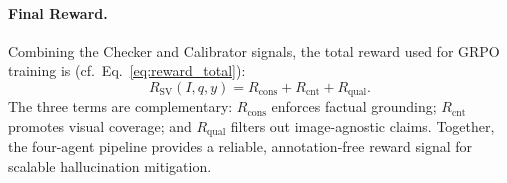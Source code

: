 \paragraph{Final Reward.}
Combining the Checker and Calibrator signals, the total reward
used for GRPO training is (cf.\ Eq.~\eqref{eq:reward_total}):
\begin{equation}
    R_{\mathrm{SV}}(I,q,y)
    = R_{\mathrm{cons}} + R_{\mathrm{cnt}} + R_{\mathrm{qual}}.
\end{equation}
The three terms are complementary: $R_{\mathrm{cons}}$ enforces
factual grounding; $R_{\mathrm{cnt}}$ promotes visual coverage; and
$R_{\mathrm{qual}}$ filters out image-agnostic claims.
Together, the four-agent pipeline provides a reliable,
annotation-free reward signal for scalable hallucination mitigation.
